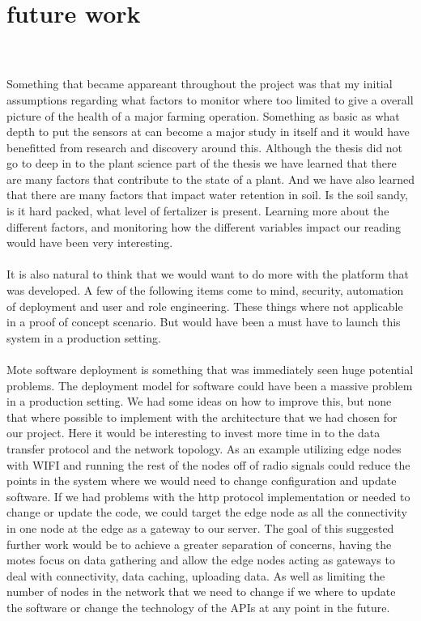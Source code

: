 \documentclass[]{uiophd}
\begin{document}
\section{future work}
\\\\
Something that became appareant throughout the project was that my initial assumptions regarding what factors to monitor where too limited to give  a overall picture of the health of a major farming operation. Something as basic as what depth to put the sensors at can become a  major study in itself and it would have benefitted from research and discovery around this. Although the thesis did not go to deep in to the plant science part of the thesis we have learned that there are many factors that contribute to the state of a plant. And we have also learned that there are many factors that impact water retention in soil. Is the soil sandy, is it hard packed, what level of fertalizer is present. Learning more about the different factors, and monitoring how the different variables impact our reading would have been very interesting.
\\\\
It is also natural to think that we would want to do more with the platform that was developed. A few of the following items come to mind, security, automation of deployment and user and role engineering. These things where not applicable in a proof of concept scenario. But would have been a must have to  launch this system in a production setting.
\\\\
Mote software deployment is something that was immediately seen huge potential problems. The deployment model for software could have been a massive problem in a production setting. We had some ideas on how to improve this, but none that where possible to implement with the architecture that we had chosen for our project. Here it would be interesting to invest more time in to the data transfer protocol and the network topology. As an example utilizing edge nodes with WIFI and running the rest of the nodes off of radio signals could reduce the points in the system where we would need to change configuration and update software. If we had problems with the http protocol implementation or needed to change or update the code, we could target the edge node as all the connectivity in one node at the edge as a gateway to our server. The goal of this suggested further work would be to achieve a greater separation of concerns, having the motes focus on data gathering and allow the edge nodes acting as gateways to deal with connectivity, data caching, uploading data. As well as limiting the number of nodes in the network that we need to change if we where to update the software or change the technology of the APIs at any point in the future.
\end{document}

